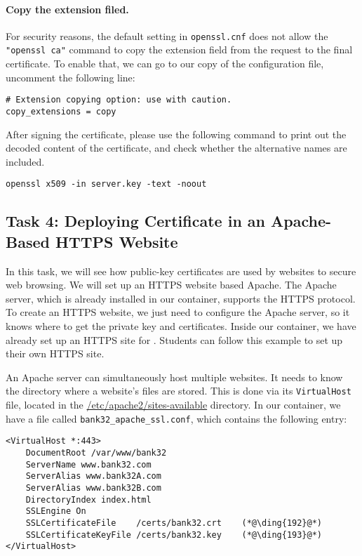 \paragraph{Copy the extension filed.}
For security reasons, the default setting in \texttt{openssl.cnf} does not allow
the \texttt{"openssl ca"} command to copy the extension field 
from the request to the final certificate. To enable that, we 
can go to our copy of the configuration file,
uncomment the following line: 

\begin{lstlisting}
# Extension copying option: use with caution.
copy_extensions = copy
\end{lstlisting}
 

After signing the certificate, please use the following command to print out 
the decoded content of the certificate, and check whether the 
alternative names are included.

\begin{lstlisting}
openssl x509 -in server.key -text -noout 
\end{lstlisting}


\subsection{Task 4: Deploying Certificate in an Apache-Based HTTPS Website}

In this task, we will see how public-key certificates 
are used by websites to secure web browsing. We will set up
an HTTPS website based Apache.  The Apache server, which is already 
installed in our container, supports the HTTPS protocol. 
To create an HTTPS website, we just need to 
configure the Apache server, so it knows where to get the private key and certificates. 
Inside our container, we have already set up an HTTPS site for \pkiserver. 
Students can follow this example to set up their own HTTPS site.

An Apache server can simultaneously host multiple websites. It needs to know
the directory where a website's files are stored. This is done via its 
\texttt{VirtualHost} file, located in the \url{/etc/apache2/sites-available}
directory. In our container, we have a file called
\texttt{bank32\_apache\_ssl.conf}, which contains the following entry:

\begin{lstlisting}
<VirtualHost *:443>
    DocumentRoot /var/www/bank32
    ServerName www.bank32.com
    ServerAlias www.bank32A.com
    ServerAlias www.bank32B.com
    DirectoryIndex index.html
    SSLEngine On
    SSLCertificateFile    /certs/bank32.crt    (*@\ding{192}@*)
    SSLCertificateKeyFile /certs/bank32.key    (*@\ding{193}@*)
</VirtualHost>
\end{lstlisting}

